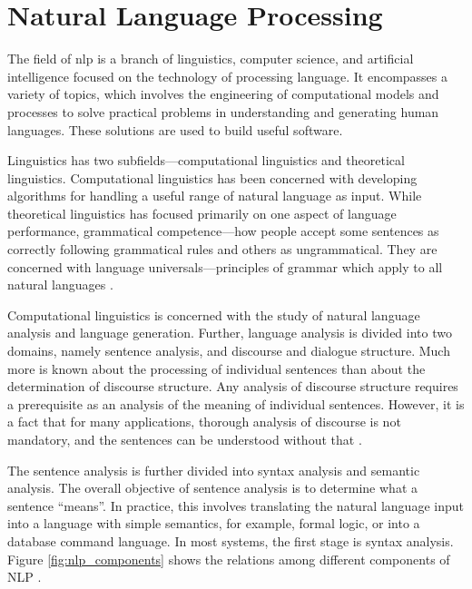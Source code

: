 \section{Natural Language Processing}\label{sec:nlp}

The field of \gls{nlp} %
 is a branch of linguistics, computer science, and artificial intelligence focused on the technology of processing language.
It encompasses a variety of topics, which involves the engineering of computational models and
processes to solve practical problems in understanding and generating human
languages. These solutions are used to build useful software.

Linguistics has two
subfields---computational linguistics and theoretical linguistics. Computational
linguistics has been concerned with developing algorithms for handling a useful
range of natural language as input. While theoretical linguistics has focused
primarily on one aspect of language performance, grammatical competence---how
people accept some sentences as correctly following grammatical rules and others as ungrammatical. They are concerned with language universals—principles of
grammar which apply to all natural languages \cite{Cole:1996}.

Computational linguistics is concerned with the study of natural language analysis
and language generation. Further, language analysis is divided into two domains,
namely sentence analysis, and discourse and dialogue structure. Much more is known
about the processing of individual sentences than about the determination of discourse
structure. Any analysis of discourse structure requires a prerequisite as an analysis of
the meaning of individual sentences. However, it is a fact that for many applications,
thorough analysis of discourse is not mandatory, and the sentences can be understood
without that \cite{grishman_computational_1986}.

The sentence analysis is further divided into syntax analysis and semantic analysis.
The overall objective of sentence analysis is to determine what a sentence “means”.
In practice, this involves translating the natural language input into a language with
simple semantics, for example, formal logic, or into a database command language.
In most systems, the first stage is syntax analysis. Figure \ref*{fig:nlp_components} shows the relations
among different components of NLP \cite{Chowdhary2020}.

